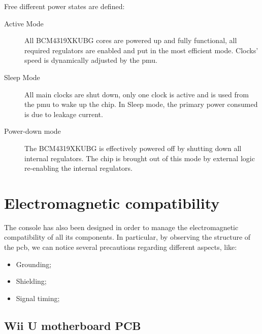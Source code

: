 \documentclass[11pt,a4paper,titlepage]{article}
\begin{document}
			Free different power states are defined:
			\begin{description}
				\item [Active Mode] All BCM4319XKUBG cores are powered up and fully functional, all required regulators are enabled and put in the most efficient mode. Clocks' speed is dynamically adjusted by the \gls{pmu}.
				\item [Sleep Mode] All main clocks are shut down, only one clock is active and is used from the \gls{pmu} to wake up the chip. In Sleep mode, the primary power consumed is due to leakage current.
				\item	[Power-down mode] The BCM4319XKUBG is effectively powered off by shutting down all internal regulators. The chip is brought out of this mode by external logic re-enabling the internal regulators.

			\end{description}

\section{Electromagnetic compatibility}
  The console has also been designed in order to manage the electromagnetic compatibility of all its components. In particular, by observing the structure of the \gls{pcb}, we can notice several precautions regarding different aspects, like:
  \begin{itemize}
		\item Grounding;
		\item Shielding;
		\item Signal timing;
  \end{itemize}

  \subsection{Wii U motherboard PCB}
\end{document}
